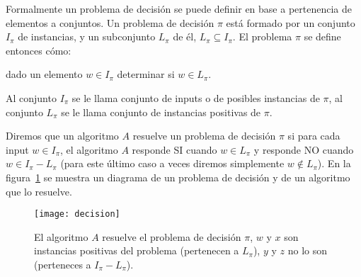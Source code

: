 \begin{definicion}
Formalmente un problema de decisión se puede definir en base a pertenencia de elementos a conjuntos.
Un problema de decisión $\pi$ está formado por un conjunto $I_\pi$ de instancias, y un subconjunto $L_\pi$ de él, $L_\pi\subseteq I_\pi$.
El problema $\pi$ se define entonces cómo:
\begin{center}dado un elemento $w\in I_\pi$ determinar si $w\in L_\pi$.\end{center}
Al conjunto $I_\pi$ se le llama conjunto de inputs o de posibles instancias de $\pi$, al conjunto $L_\pi$ se le llama conjunto de  instancias positivas de $\pi$.

Diremos que un algoritmo $A$ resuelve un problema de decisión $\pi$ si para cada input $w\in I_\pi$, el algoritmo $A$ responde SI cuando $w\in L_\pi$ y responde NO cuando $w\in I_\pi-L_\pi$ (para este último caso a veces diremos simplemente $w\notin L_\pi$).
En la figura~\ref{fig:decision} se muestra un diagrama de un problema de decisión y de un algoritmo que lo resuelve.
\begin{figure}[h!]
\centering
\texttt{[image: decision]}
\caption{El algoritmo $A$ resuelve el problema de decisión $\pi$, $w$ y $x$ son instancias positivas del problema (pertenecen a $L_\pi$), $y$ y $z$ no lo son (perteneces a $I_\pi-L_\pi$).}
\label{fig:decision}
\end{figure}
\end{definicion}


